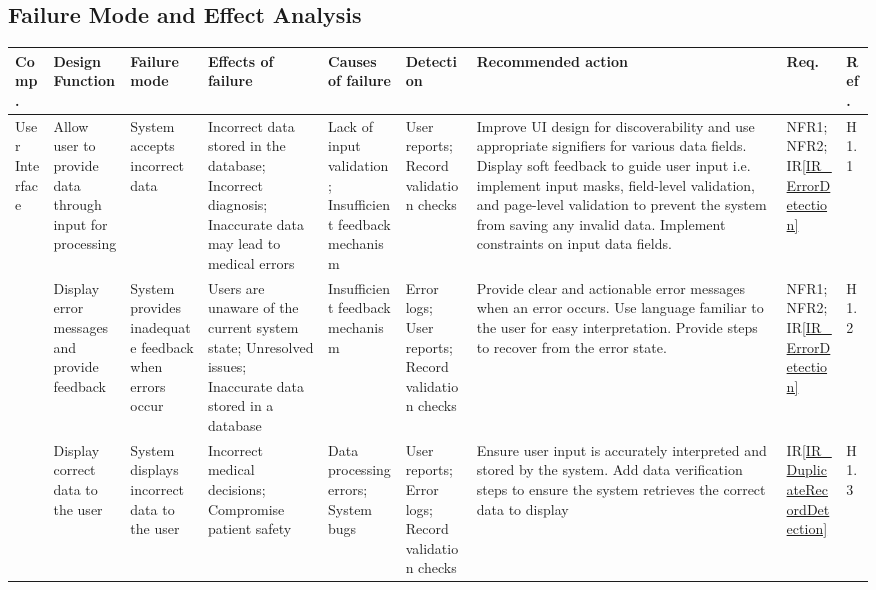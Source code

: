 \documentclass{article}
\begin{document}
\begin{landscape} 

\section{Failure Mode and Effect Analysis}
    
    \begin{longtable}{|p{1.5cm}|p{2cm}|p{2.6cm}|p{2cm}|p{2cm}|p{2cm}|p{3.5cm}|p{1cm}|p{0.8cm}|}
        \toprule
        \textbf{Comp.} & \textbf{Design Function} & \textbf{Failure mode} & \textbf{Effects of failure} & \textbf{Causes of failure} & \textbf{Detection} & \textbf{Recommended action} & \textbf{Req.} & \textbf{Ref.}\\ 
        \midrule
        User Interface & \raggedright Allow user to provide data through input for processing & \raggedright System accepts incorrect data & \raggedright Incorrect data stored in the database; Incorrect diagnosis; Inaccurate data may lead to medical errors & \raggedright Lack of input validation; Insufficient feedback mechanism & \raggedright User reports; Record validation checks & \raggedright Improve UI design for discoverability and use appropriate signifiers for various data fields. Display soft feedback to guide user input i.e. implement input masks, field-level validation, and page-level validation to prevent the system from saving any invalid data. Implement constraints on input data fields. & NFR1; NFR2; IR\ref{IR_ErrorDetection} & H1.1 \\ 
        \midrule
        & \raggedright Display error messages and provide feedback & \raggedright System provides inadequate feedback when errors occur & \raggedright Users are unaware of the current system state; Unresolved issues; Inaccurate data stored in a database & \raggedright Insufficient feedback mechanism & \raggedright Error logs; User reports; Record validation checks & \raggedright Provide clear and actionable error messages when an error occurs. Use language familiar to the user for easy interpretation. Provide steps to recover from the error state. & NFR1; NFR2; IR\ref{IR_ErrorDetection} & H1.2 \\
        \midrule
        & \raggedright Display correct data to the user & \raggedright System displays incorrect data to the user & \raggedright Incorrect medical decisions; Compromise patient safety & \raggedright Data processing errors; System bugs & \raggedright User reports; Error logs; Record validation checks & \raggedright Ensure user input is accurately interpreted and stored by the system. Add data verification steps to ensure the system retrieves the correct data to display & IR\ref{IR_DuplicateRecordDetection} & H1.3 \\

\end{longtable}
\end{landscape}
\end{document}
